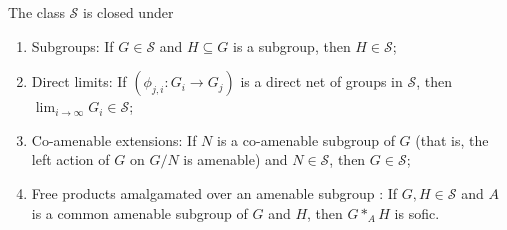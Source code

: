 \begin{theorem}
The class $\mathscr{S}$ is closed under
\begin{enumerate}
\item[(a)] Subgroups: If $G\in\mathscr{S}$ and $H\subseteq G$ is a subgroup, then $H\in\mathscr{S}$;
\item[(b)] Direct limits: If $\left(\phi_{j,i}: G_i\to G_j\right)$ is a direct net of groups in $\mathscr{S}$, then $\lim_{i\to\infty}G_i\in\mathscr{S}$;
\item[(c)] Co-amenable extensions: If $N$ is a co-amenable subgroup of $G$ (that is, the left action of $G$ on $G/N$ is amenable) and $N\in\mathscr{S}$, then $G\in\mathscr{S}$;
\item[(d)] Free products amalgamated over an amenable subgroup \cite[Theorem 3.17]{MR2826401}: If $G,H\in\mathscr{S}$ and $A$ is a common amenable subgroup of $G$ and $H$, then $G\ast_A H$ is sofic.
\end{enumerate}
\end{theorem}
